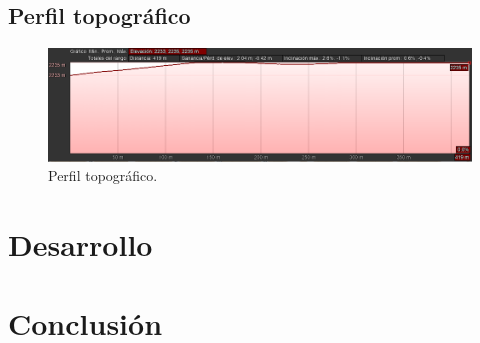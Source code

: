 \documentclass[11pt,letterpaper]{article}
\begin{document}
\newpage
\subsection{Perfil topográfico}
\begin{figure}[ht]
    \centering
    \includegraphics[width=.9\textwidth, angle=90]{imagenes/t14.png}
    \caption{Perfil topográfico.}
\end{figure}

\newpage
\section{Desarrollo}

\newpage
\section{Conclusión}
\end{document}
